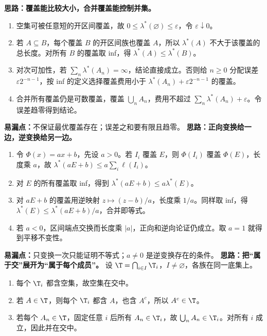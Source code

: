 \textbf{思路：覆盖能比较大小，合并覆盖能控制并集。}
\begin{enumerate}
\item 空集可被任意短的开区间覆盖，故 $0\le\lambda^*(\varnothing)\le\varepsilon$，令 $\varepsilon\downarrow0$。
\item 若 $A\subseteq B$，每个覆盖 $B$ 的开区间族也覆盖 $A$，所以 $\lambda^*(A)$ 不大于该覆盖的总长度。对所有 $B$ 的覆盖取 inf，得 $\lambda^*(A)\le\lambda^*(B)$。
\item 对次可加性，若 $\sum_n\lambda^*(A_n)=\infty$，结论直接成立。否则给 $n\ge0$ 分配误差 $\varepsilon2^{-n-1}$，按 inf 的定义选择覆盖费用小于 $\lambda^*(A_n)+\varepsilon2^{-n-1}$ 的覆盖。
\item 合并所有覆盖仍是可数覆盖，覆盖 $\bigcup_n A_n$，费用不超过 $\sum_n\lambda^*(A_n)+\varepsilon$。令误差趋零得到结论。
\end{enumerate}
\textbf{易漏点：}不保证最优覆盖存在；误差之和要有限且趋零。
\textbf{思路：正向变换给一边，逆变换给另一边。}
\begin{enumerate}
\item 令 $\Phi(x)=ax+b$，先设 $a>0$。若 $I_i$ 覆盖 $E$，则 $\Phi(I_i)$ 覆盖 $\Phi(E)$，长度乘 $a$，故 $\lambda^*(aE+b)\le a\sum_i\ell(I_i)$。
\item 对 $E$ 的所有覆盖取 inf，得到 $\lambda^*(aE+b)\le a\lambda^*(E)$。
\item 对 $aE+b$ 的覆盖用逆映射 $z\mapsto(z-b)/a$，长度乘 $1/a$。同样取 inf，得 $\lambda^*(E)\le\lambda^*(aE+b)/a$，合并即等式。
\item 若 $a<0$，区间端点交换而长度乘 $|a|$，正向和逆向论证仍成立。取 $a=1$ 就得到平移不变性。
\end{enumerate}
\textbf{易漏点：}只变换一次只能证明不等式；$a\ne0$ 是逆变换存在的条件。
\textbf{思路：把“属于交”展开为“属于每个成员”。}
设 $\T=\bigcap_{i\in I}\T_i$，$I\ne\varnothing$，各族在同一底集上。
\begin{enumerate}
\item 每个 $\T_i$ 都含空集，故空集在交中。
\item 若 $A\in\T$，则每个 $\T_i$ 都含 $A$，也含 $A^c$，所以 $A^c\in\T$。
\item 若每个 $A_n\in\T$，固定任意 $i$ 后所有 $A_n\in\T_i$，故 $\bigcup_n A_n\in\T_i$。对所有 $i$ 成立，因此并在交中。
\end{enumerate}
